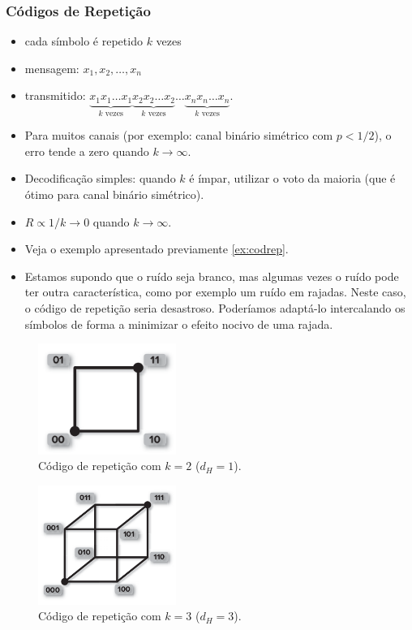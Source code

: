 \begin{frame}[allowframebreaks]
  \frametitle{Códigos de Repetição}
  \begin{itemize}
  \item cada símbolo é repetido $k$ vezes
  \item mensagem: $x_1, x_2, \ldots, x_n$
  \item transmitido: $\underbrace{x_1 x_1 \ldots x_1}_{k \text{ vezes}} \underbrace{x_2 x_2 \ldots x_2}_{k \text{ vezes}} \ldots \underbrace{x_n x_n \ldots x_n}_{k \text{ vezes}}$.
  \item Para muitos canais (por exemplo: canal binário simétrico com $p<1/2$), o erro tende a zero quando $k \rightarrow \infty$.
  \item Decodificação simples: quando $k$ é ímpar, utilizar o voto da maioria (que é ótimo para canal binário simétrico).
  \item $R \propto 1/k \rightarrow 0$ quando $k \rightarrow \infty$.
  \item Veja o exemplo apresentado previamente \ref{ex:codrep}.
  \item Estamos supondo que o ruído seja branco, mas algumas vezes o ruído pode ter
	outra característica, como por exemplo um ruído em rajadas. Neste caso,
	o código de repetição seria desastroso. Poderíamos adaptá-lo intercalando 
	os símbolos de forma a minimizar o efeito nocivo de uma rajada.
  \end{itemize}

                \begin{figure}[h!]
                \centering
                \includegraphics[width=0.4\textwidth]{images/repeatingcode2.png}
		\caption{Código de repetição com $k=2$ ($d_H = 1$).}
                \label{fig:repeatingcode2}
                \end{figure}


                \begin{figure}[h!]
                \centering
                \includegraphics[width=0.4\textwidth]{images/repeatingcode3.png}
		\caption{Código de repetição com $k=3$ ($d_H = 3$).}
                \label{fig:repeatingcode3}
                \end{figure}


\end{frame}
